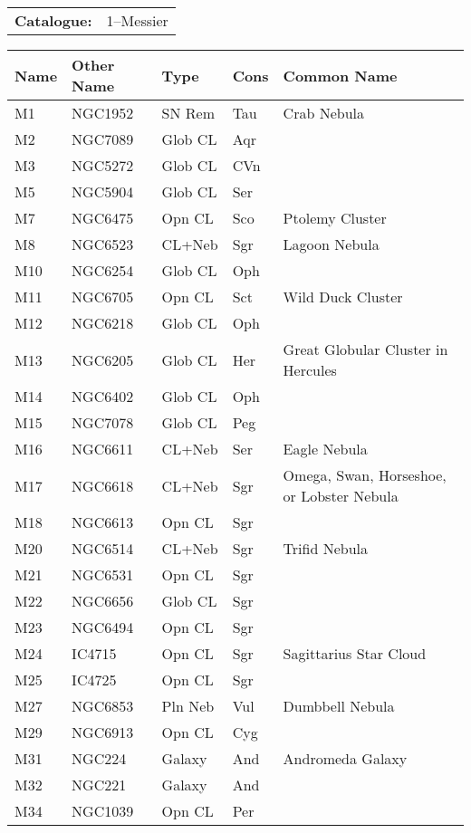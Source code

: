 \begin{tabular}{ p{0.9in} p{1.3in}}
{\bf Catalogue:} & 1--Messier \\ 
\end{tabular}
\begin{longtable}{ p{0.7in}  p{1.0in}  p{0.6in}  p{0.9in}  p{5.1in} }
\hline 
{\bf Name} & {\bf Other Name} & {\bf Type} & {\bf Cons} & {\bf Common Name} \\ 
\hline 
M1 & NGC1952 & SN Rem & Tau & Crab Nebula \\ 
M2 & NGC7089 & Glob CL & Aqr &  \\ 
M3 & NGC5272 & Glob CL & CVn &  \\ 
M5 & NGC5904 & Glob CL & Ser &  \\ 
M7 & NGC6475 & Opn CL & Sco & Ptolemy Cluster \\ 
M8 & NGC6523 & CL+Neb & Sgr & Lagoon Nebula \\ 
M10 & NGC6254 & Glob CL & Oph &  \\ 
M11 & NGC6705 & Opn CL & Sct & Wild Duck Cluster \\ 
M12 & NGC6218 & Glob CL & Oph &  \\ 
M13 & NGC6205 & Glob CL & Her & Great Globular Cluster in Hercules \\ 
M14 & NGC6402 & Glob CL & Oph &  \\ 
M15 & NGC7078 & Glob CL & Peg &  \\ 
M16 & NGC6611 & CL+Neb & Ser & Eagle Nebula \\ 
M17 & NGC6618 & CL+Neb & Sgr & Omega, Swan, Horseshoe, or Lobster Nebula \\ 
M18 & NGC6613 & Opn CL & Sgr &  \\ 
M20 & NGC6514 & CL+Neb & Sgr & Trifid Nebula \\ 
M21 & NGC6531 & Opn CL & Sgr &  \\ 
M22 & NGC6656 & Glob CL & Sgr &  \\ 
M23 & NGC6494 & Opn CL & Sgr &  \\ 
M24 & IC4715 & Opn CL & Sgr & Sagittarius Star Cloud \\ 
M25 & IC4725 & Opn CL & Sgr &  \\ 
M27 & NGC6853 & Pln Neb & Vul & Dumbbell Nebula \\ 
M29 & NGC6913 & Opn CL & Cyg &  \\ 
M31 & NGC224 & Galaxy & And & Andromeda Galaxy \\ 
M32 & NGC221 & Galaxy & And &  \\ 
M34 & NGC1039 & Opn CL & Per &  \\ 

\end{longtable}
